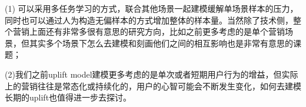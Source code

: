 \documentclass[12pt]{article}
\begin{document}
(1) 可以采用多任务学习的方式，联合其他场景一起建模缓解单场景样本的压力，同时也可以通过人为构造无偏样本的方式增加整体的样本量。当然除了技术侧，整个营销上面还有非常多很有意思的研究方向，比如之前更多考虑的是单个营销场景，但其实多个场景下怎么去建模和刻画他们之间的相互影响也是非常有意思的课题；

(2)我们之前uplift model建模更多考虑的是单次或者短期用户行为的增益，但实际上的营销往往是常态化或持续化的，用户的心智可能会不断发生变化，如何去建模长期的uplift也值得进一步去探讨。



\end{document}

